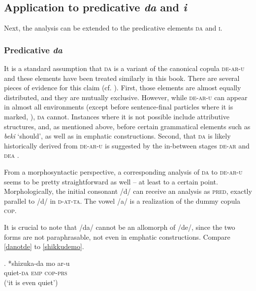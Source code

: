 \documentclass [output=book,colorlinks,citecolor=brown]{langscibook}
\begin{document}
\subsection{Application to predicative \textit{da} and \textit{i}} \label{kitoi}

Next, the analysis can be extended to the predicative elements \textsc{da} and \textsc{i}.

\subsubsection{Predicative \textit{da}}

It is a standard assumption that \textsc{da} is a variant of the canonical copula \textsc{de-ar-u} \citep{urushibara:1993:syntactic} and these elements have been treated similarly in this book. There are several pieces of evidence for this claim (cf. \citealt{miyama:2011:da}). First, those elements are almost equally distributed, and they are mutually exclusive. However, while \textsc{de-ar-u} can appear in almost all environments (except before sentence-final particles where it is marked, \citealt[45–46]{miyama:2011:da}), \textsc{da} cannot. Instances where it is not possible include attributive structures, and, as mentioned above, before certain grammatical elements such as \textit{beki} `should’, as well as in emphatic constructions. Second, that \textsc{da} is likely historically derived from \textsc{de-ar-u} is suggested by the in-between stages \textsc{de-ar} and \textsc{dea} \citep{nakahara:2002:japanese}. %

From a morphosyntactic perspective, a corresponding analysis of \textsc{da} to \textsc{de-ar-u} seems to be pretty straightforward as well -- at least to a certain point. Morphologically, the initial consonant /d/ can receive an analysis as \textsc{pred}, exactly parallel to /d/ in \textsc{d-at-ta}. The vowel /a/ is a realization of the dummy copula \textsc{cop}. %

It is crucial to note that /da/ cannot be an allomorph of /de/, since the two forms are not paraphrasable, not even in emphatic constructions. Compare \ref{danotde} to \ref{shikkudemo}. %

\exg. *shizuka-da mo ar-u\\
quiet-\textsc{da} \textsc{emp} \textsc{cop-prs}\\
(`it is even quiet’) \null \hfill \citep[186]{nishiyama:1999:adj} \label{danotde}
\end{document}
